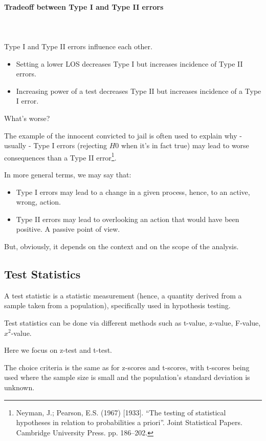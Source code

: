 \documentclass{article}
\begin{document}
\paragraph{Tradeoff between Type I and Type II errors}\mbox{} \\
\mbox{} \\
Type I and Type II errors influence each other.
\begin{itemize}
    \item Setting a lower LOS decreases Type I but increases incidence of Type II errors.
    \item Increasing power of a test decreases Type II but increases incidence of a Type I error.
\end{itemize}

What’s worse?

The example of the innocent convicted to jail is often used to explain why - usually - Type I errors (rejecting $H0$ when it’s in fact true) may lead to worse consequences than a Type II error\footnote{Neyman, J.; Pearson, E.S. (1967) [1933]. “The testing of statistical hypotheses in relation to probabilities a priori”. Joint Statistical Papers. Cambridge University Press. pp. 186–202.}.

In more general terms, we may say that: 
\begin{itemize}
    \item Type I errors may lead to a change in a given process, hence, to an active, wrong, action.
    \item Type II errors may lead to overlooking an action that would have been positive. A passive point of view.
\end{itemize}

But, obviously, it depends on the context and on the scope of the analysis. 

\subsection{Test Statistics}
A test statistic is a statistic measurement (hence, a quantity derived from a sample taken from a population), specifically used in hypothesis testing. 

Test statistics can be done via different methods such as t-value, z-value, F-value, $x^2$-value.

Here we focus on z-test and t-test. 

The choice criteria is the same as for z-scores and t-scores, with t-scores being used where the sample size is small and the population's standard deviation is unknown. 
\end{document}
